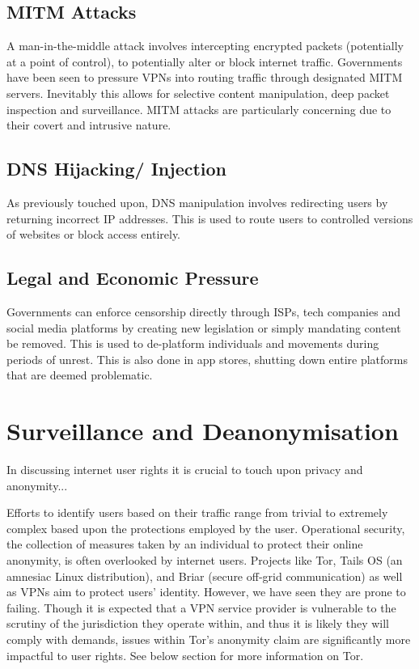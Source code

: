 \subsection{MITM Attacks}
A man-in-the-middle attack involves intercepting encrypted packets (potentially at a point of control), to potentially alter or block internet traffic. Governments have been seen to pressure VPNs into routing traffic through designated MITM servers. Inevitably this allows for selective content manipulation, deep packet inspection and surveillance. MITM attacks are particularly concerning due to their covert and intrusive nature. 
 
\subsection{DNS Hijacking/ Injection}
As previously touched upon, DNS manipulation involves redirecting users by returning incorrect IP addresses. This is used to route users to controlled versions of websites or block access entirely. 

\subsection{Legal and Economic Pressure}
Governments can enforce censorship directly through ISPs, tech companies and social media platforms by creating new legislation or simply mandating content be removed. This is used to de-platform individuals and movements during periods of unrest. This is also done in app stores, shutting down entire platforms that are deemed problematic.












\section{Surveillance and Deanonymisation}

In discussing internet user rights it is crucial to touch upon privacy and anonymity...

Efforts to identify users based on their traffic range from trivial to extremely complex based upon the protections employed by the user. Operational security, the collection of measures taken by an individual to protect their online anonymity, is often overlooked by internet users. Projects like Tor, Tails OS (an amnesiac Linux distribution), and Briar (secure off-grid communication) as well as VPNs aim to protect users’ identity. However, we have seen they are prone to failing. Though it is expected that a VPN service provider is vulnerable to the scrutiny of the jurisdiction they operate within, and thus it is likely they will comply with demands, issues 
within Tor’s anonymity claim are significantly more impactful to user rights. See below section for more information on Tor. 

